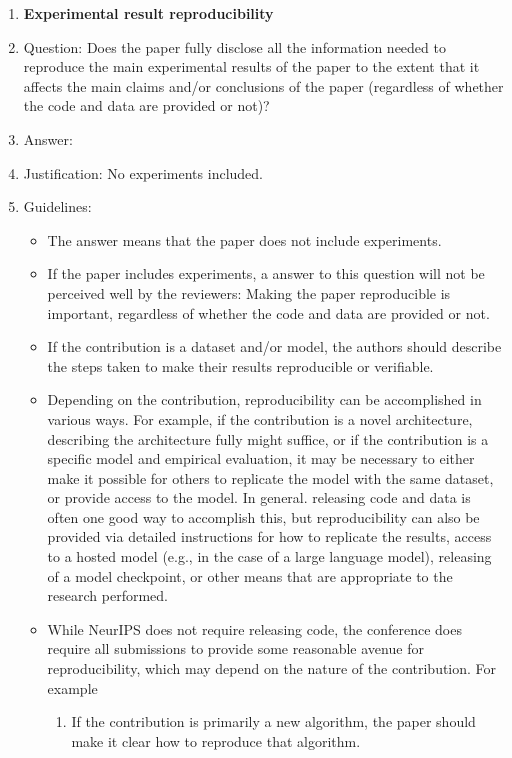 \documentclass{article}
\numberwithin{theorem}{section}
\theoremstyle{definition}
\begin{document}
\begin{enumerate}
    \item {\bf Experimental result reproducibility}
    \item[] Question: Does the paper fully disclose all the information needed to reproduce the main experimental results of the paper to the extent that it affects the main claims and/or conclusions of the paper (regardless of whether the code and data are provided or not)?
    \item[] Answer: \answerNA{} %
    \item[] Justification: No experiments included.
    \item[] Guidelines:
    \begin{itemize}
        \item The answer \answerNA{} means that the paper does not include experiments.
        \item If the paper includes experiments, a \answerNo{} answer to this question will not be perceived well by the reviewers: Making the paper reproducible is important, regardless of whether the code and data are provided or not.
        \item If the contribution is a dataset and\slash or model, the authors should describe the steps taken to make their results reproducible or verifiable. 
        \item Depending on the contribution, reproducibility can be accomplished in various ways. For example, if the contribution is a novel architecture, describing the architecture fully might suffice, or if the contribution is a specific model and empirical evaluation, it may be necessary to either make it possible for others to replicate the model with the same dataset, or provide access to the model. In general. releasing code and data is often one good way to accomplish this, but reproducibility can also be provided via detailed instructions for how to replicate the results, access to a hosted model (e.g., in the case of a large language model), releasing of a model checkpoint, or other means that are appropriate to the research performed.
        \item While NeurIPS does not require releasing code, the conference does require all submissions to provide some reasonable avenue for reproducibility, which may depend on the nature of the contribution. For example
        \begin{enumerate}
            \item If the contribution is primarily a new algorithm, the paper should make it clear how to reproduce that algorithm.

\end{enumerate}
\end{itemize}
\end{enumerate}
\end{document}
